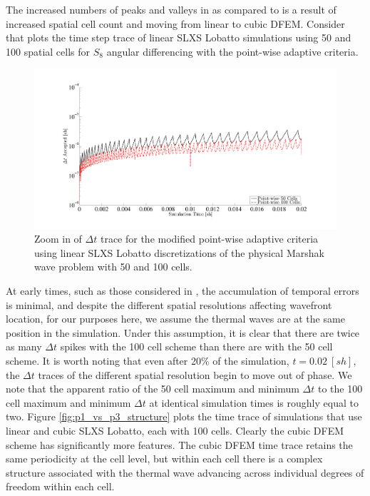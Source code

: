 The increased numbers of peaks and valleys in  as compared to  is a result of increased spatial cell count and moving from linear to cubic DFEM.
Consider  that plots the time step trace of linear SLXS Lobatto simulations using 50 and 100 spatial cells for $S_8$ angular differencing with the point-wise adaptive criteria.
\begin{figure}[!htp]
\centering
\includegraphics[width=16cm,trim=2in  0.4in 0.5in 0.75in,clip=true]{chapter6_grey_radtran/Dissertation_Data/S8_P1_50C_vs_100C_Pointwise_in_time_zoom.pdf}
\caption{Zoom in of $\Delta t$ trace for the modified point-wise adaptive criteria using linear SLXS Lobatto discretizations of the physical Marshak wave problem with 50 and 100 cells.}
\label{fig:p1_50c_vs_100c}
\end{figure}
At early times, such as those considered in , the accumulation of temporal errors is minimal, and despite the different spatial resolutions affecting wavefront location, for our purposes here, we assume the thermal waves are at the same position in the simulation. 
Under this assumption, it is clear that there are twice as many $\Delta t$ spikes with the 100 cell scheme than there are with the 50 cell scheme.
It is worth noting that even after 20\% of the simulation, $t=0.02~[sh]$, the $\Delta t$ traces of the different spatial resolution begin to move out of phase.
We note that the apparent ratio of the 50 cell maximum and minimum $\Delta t$ to the 100 cell maximum and minimum $\Delta t$ at identical simulation times is roughly equal to two.
Figure \ref{fig:p1_vs_p3_structure} plots the time trace of simulations that use linear and cubic SLXS Lobatto, each with 100 cells.
Clearly the cubic DFEM scheme has significantly more features.   
The cubic DFEM time trace retains the same periodicity at the cell level, but within each cell there is a complex structure associated with the thermal wave advancing across individual degrees of freedom within each cell. 

